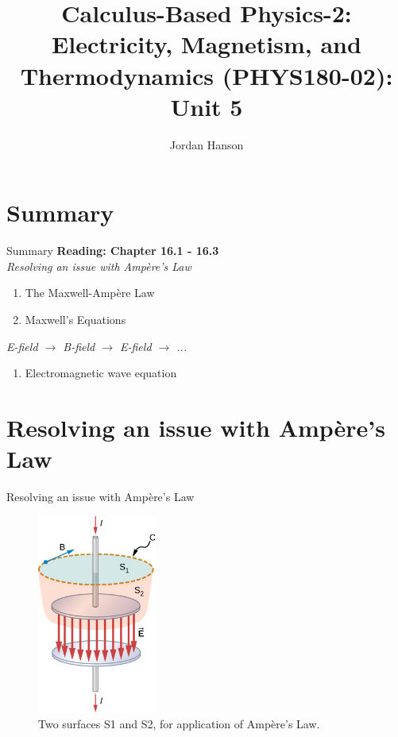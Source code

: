 \documentclass{beamer}
\title{Calculus-Based Physics-2: Electricity, Magnetism, and Thermodynamics (PHYS180-02): Unit 5}
\author{Jordan Hanson}
\institute{Whittier College Department of Physics and Astronomy}
\begin{document}
\maketitle

\section{Summary}

\begin{frame}{Summary}
\textbf{Reading: Chapter 16.1 - 16.3} \\ \vspace{0.5cm}
\textit{Resolving an issue with Amp\`{e}re's Law}
\begin{enumerate}
\item The Maxwell-Amp\`{e}re Law
\item Maxwell's Equations
\end{enumerate}
\textit{E-field $\rightarrow$ B-field $\rightarrow$ E-field $\rightarrow$ ...}
\begin{enumerate}
\item Electromagnetic wave equation
\end{enumerate}
\end{frame}

\section{Resolving an issue with  Amp\`{e}re's Law}

\begin{frame}{Resolving an issue with  Amp\`{e}re's Law}
\begin{figure}
\centering
\includegraphics[width=0.35\textwidth]{figures/surface.jpeg}
\caption{\label{fig:surf} Two surfaces S1 and S2, for application of Amp\`{e}re's Law.}
\end{figure}
\end{frame}
\end{document}

